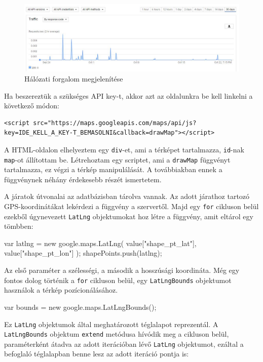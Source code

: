 \begin{figure}[h!]
\centering
\includegraphics[scale=0.5]{kepek/google_maps_api_2.jpg}
\caption{Hálózati forgalom megjelenítése}
\label{fig:google_maps_api_2}
\end{figure}

Ha beszereztük a szükséges API key-t, akkor azt az oldalunkra be kell linkelni a következő módon:

\begin{verbatim}
<script src="https://maps.googleapis.com/maps/api/js?
key=IDE_KELL_A_KEY-T_BEMASOLNI&callback=drawMap"></script>
\end{verbatim}

A HTML-oldalon elhelyeztem egy \texttt{div}-et, ami a térképet tartalmazza, \texttt{id}-nak \texttt{map}-ot állítottam be. Létrehoztam egy scriptet, ami a \texttt{drawMap} függvényt tartalmazza, ez végzi a térkép manipulálását. A továbbiakban ennek a függvénynek néhány érdekesebb részét ismertetem.

A járatok útvonalai az adatbázisban tárolva vannak. Az adott járathoz tartozó GPS-koordinátákat lekérdezi a függvény a szervertől. Majd egy \texttt{for} cikluson belül ezekből úgynevezett \texttt{LatLng} objektumokat hoz létre a függvény, amit eltárol egy tömbben:

\begin{cpp}
var latlng = new google.maps.LatLng(
    value["shape_pt_lat"],
    value["shape_pt_lon"]
);
shapePoints.push(latlng);
\end{cpp}

Az első paraméter a szélességi, a második a hosszúsági koordináta. Még egy fontos dolog történik a \texttt{for} cikluson belül, egy \texttt{LatLngBounds} objektumot használok a térkép pozícionálásához.

\begin{cpp}
var bounds = new google.maps.LatLngBounds();
\end{cpp}

Ez \texttt{LatLng} objektumok által meghatározott téglalapot reprezentál. A \texttt{LatLngBounds} objektum \texttt{extend} metódusa hívódik meg a cikluson belül, paraméterként átadva az adott iterációban lévő \texttt{LatLng} objektumot, ezáltal a befoglaló téglalapban benne lesz az adott iteráció pontja is:

